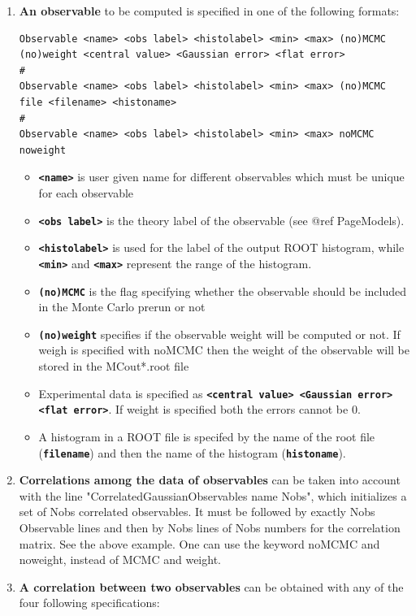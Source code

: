 \documentclass[preprint,3p,12pt]{elsarticle}
\begin{document}
\begin{enumerate}
\item  {\bf An observable} to be computed is specified in one of the following formats:
\begin{lstlisting}
Observable <name> <obs label> <histolabel> <min> <max> (no)MCMC (no)weight <central value> <Gaussian error> <flat error>
#
Observable <name> <obs label> <histolabel> <min> <max> (no)MCMC file <filename> <histoname>
#
Observable <name> <obs label> <histolabel> <min> <max> noMCMC noweight
\end{lstlisting}
\begin{itemize}
  \item {\bf \texttt{<name>}} is user given name for different observables which must be unique for each observable
  \item {\bf \texttt{<obs label>}} is the theory label of the observable (see @ref PageModels).
  \item {\bf \texttt{<histolabel>}} is used for the label of the output ROOT histogram,
  while {\bf \texttt{<min>}} and {\bf \texttt{<max>}} represent the range of the histogram.
  \item  {\bf \texttt{(no)MCMC}} is the flag specifying whether the observable should be included in the Monte Carlo prerun or not 
  \item {\bf \texttt{(no)weight}} specifies if the observable weight will be computed or not. If weigh is specified with noMCMC
    then the weight of the observable will be stored in the MCout*.root file
  \item Experimental data is specified as {\bf \texttt{<central value>  <Gaussian error>  <flat error>}}. If weight is specified
    both the errors cannot be 0.
  \item A histogram in a ROOT file is specifed by the name of the root file ({\bf \texttt{filename}}) and then the
    name of the histogram ({\bf \texttt{histoname}}).
\end{itemize}

\item  {\bf Correlations among the data of observables} can be taken into
   account with the line "CorrelatedGaussianObservables name Nobs",
   which initializes a set of Nobs correlated observables. It must be
   followed by exactly Nobs Observable lines and then by Nobs lines of
   Nobs numbers for the correlation matrix. See the above example.
   One can use the keyword noMCMC and noweight, instead of MCMC and weight.

\item  {\bf A correlation between two observables} can be obtained with any of the four following specifications: 


\end{enumerate}
\end{document}

